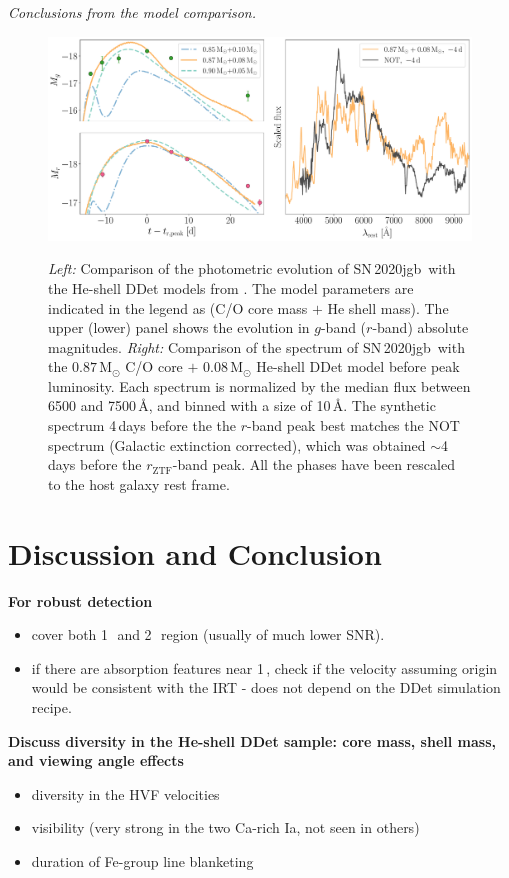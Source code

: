 \documentclass[twocolumn]{aastex631}
\newcommand{\sn}{SN\,2020jgb}
\begin{document}
{\it Conclusions from the model comparison.}

\begin{figure}
    \centering
    \includegraphics[width=\textwidth]{model.pdf}
    \label{fig:model}
    \caption{{\it Left:} Comparison of the photometric evolution of \sn\ with the He-shell DDet models from \citet{polin_observational_2019}. The model parameters are indicated in the legend as (C/O core mass $+$ He shell mass). The upper (lower) panel shows the evolution in $g$-band ($r$-band) absolute magnitudes. {\it Right:} Comparison of the spectrum of \sn\ with the $0.87\,\mathrm{M_\odot}$ C/O core $+$ $0.08\,\mathrm{M_\odot}$ He-shell DDet model before peak luminosity. Each spectrum is normalized by the median flux between 6500 and 7500\,\r{A}, and binned with a size of 10\,\r{A}. The synthetic spectrum 4\,days before the the $r$-band peak best matches the NOT spectrum (Galactic extinction corrected), which was obtained $\sim$4\,days before the $r_\mathrm{ZTF}$-band peak. All the phases have been rescaled to the host galaxy rest frame. }
\end{figure}
\section{Discussion and Conclusion} \label{sec:discussion}
\textbf{For robust  detection}
\begin{itemize}
    \item cover both 1\,\micron\ and 2\,\micron\ region (usually of much lower SNR).
    \item if there are absorption features near 1\,\micron, check if the velocity assuming  origin would be consistent with the  IRT - does not depend on the DDet simulation recipe.
\end{itemize}

\textbf{Discuss diversity in the He-shell DDet sample: core mass, shell mass, and viewing angle effects}
\begin{itemize}
    \item diversity in the HVF velocities
    \item {} visibility (very strong in the two Ca-rich Ia, not seen in others)
    \item duration of Fe-group line blanketing
\end{itemize}
\end{document}
